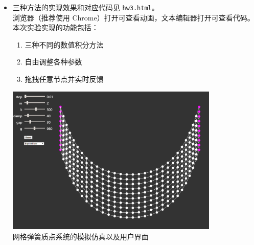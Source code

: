 \documentclass[a4paper, 12pt]{article}
\begin{document}
\begin{itemize}[leftmargin=*, label={}]

\item 三种方法的实现效果和对应代码见 \texttt{hw3.html}。\\
浏览器（推荐使用 Chrome）打开可查看动画，文本编辑器打开可查看代码。\\

本次实验实现的功能包括：

\begin{enumerate}[leftmargin=*]

\item 三种不同的数值积分方法
\item 自由调整各种参数
\item 拖拽任意节点并实时反馈

\end{enumerate}

\begin{center}
\includegraphics[width=0.8\textwidth]{images/euler.png}\\
网格弹簧质点系统的模拟仿真以及用户界面
\end{center}

\end{itemize}
\end{document}
